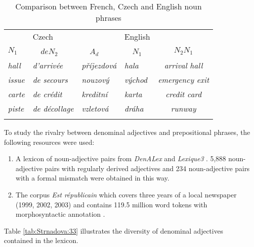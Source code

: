 \documentclass[output=paper]{LSP/langsci}
\begin{document}
\begin{table}

\begin{tabularx}{.8\textwidth}{lX@{\qquad}ll@{\qquad}c }
\lsptoprule
\multicolumn{2}{l}{\hspace*{5mm}French}& \multicolumn{2}{l}{\hspace*{5mm}Czech} &English\\
{$N_1$}& ~~{$deN_2$}&~~{$A_d$}& ~~{$N_1$}& $N_2N_1$\\
\midrule
\emph{hall} &\emph{d'arrivée}& \emph{p\v{r}\'{i}jezdov\'{a}}& \emph{hala} & \emph{arrival hall}  \\
\emph{issue} &\emph{de secours}&\emph{nouzov\'{y}}&\emph{v\'{y}chod}& \emph{emergency exit}\\
\emph{carte}& \emph{de crédit}&\emph{kreditn\'{i}}& \emph{karta}& \emph{credit card}\\
\emph{piste} &\emph{de décollage}& \emph{vzletov\'{a}}& \emph{dr\'{a}ha}& \emph{runway} \\
\lspbottomrule
\end{tabularx}
\caption{Comparison between French, Czech and English noun phrases}
\label{tab:Strnadova:compar-langues}
\end{table}

To study the rivalry between  denominal adjectives and prepositional phrases, the following resources were used:
\begin{enumerate}
\item A lexicon of noun-adjective pairs  from \emph{DenALex} \citep{strnad2011} and \emph{Lexique3} \citep{new2006lexique}. 5,888 noun-adjective pairs with regularly derived adjectives
and 234 noun-adjective pairs with a formal mismatch were obtained in this way.
\item The corpus \emph{Est républicain} which covers three years of a local newspaper (1999, 2002, 2003) and contains 119.5 million word tokens with morphosyntactic annotation \citep{seddah2012}.
\end{enumerate}
Table \ref{tab:Strnadova:33} illustrates the diversity of denominal adjectives contained in the lexicon.
\end{document}
